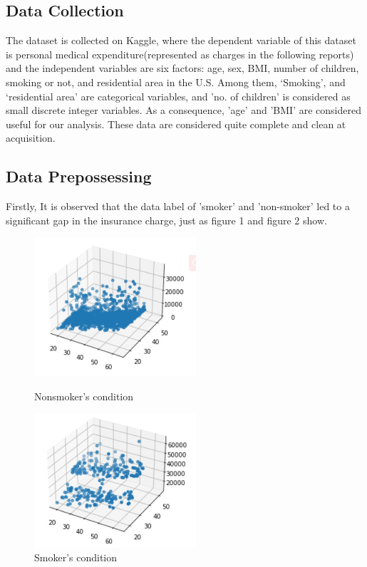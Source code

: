 \documentclass[12pt,a4paper]{article}
\begin{document}
\subsection{Data Collection}
 The dataset is collected on Kaggle, where the dependent variable of this dataset is personal medical expenditure(represented as charges in the following reports) and the independent variables are six factors: age, sex, BMI, number of children, smoking or not, and residential area in the U.S. Among them,  ‘Smoking’, and ‘residential area’ are categorical variables, and 'no. of children' is considered as small discrete integer variables. As a consequence, 'age' and 'BMI' are considered useful for our analysis. These data are considered quite complete and clean at acquisition. 
 
\subsection{Data Prepossessing}
Firstly, It is observed that the data label of 'smoker' and 'non-smoker' led to a significant gap in the insurance charge, just as figure 1 and figure 2 show. 

\begin{figure}[H]
\centering
\begin{minipage}[t]{0.48\textwidth}
\centering
\includegraphics[width=6cm]{nonsmokeroverall.jpg}
\caption{Nonsmoker's condition}
\end{minipage}
\begin{minipage}[t]{0.48\textwidth}
\centering
\includegraphics[width=6cm]{smokeroverall.jpg}
\caption{Smoker's condition}
\end{minipage}
\end{figure}
\end{document}
